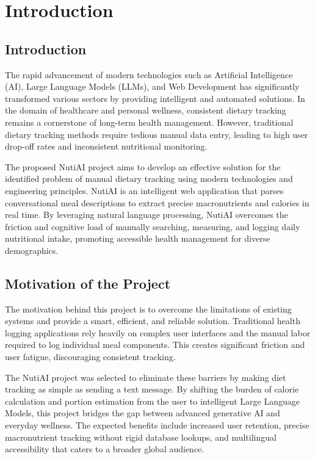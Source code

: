 \documentclass[12pt,a4paper]{report}
\begin{document}
\chapter{Introduction} 

\section{Introduction}
The rapid advancement of modern technologies such as Artificial Intelligence (AI), Large Language Models (LLMs), and Web Development has significantly transformed various sectors by providing intelligent and automated solutions. In the domain of healthcare and personal wellness, consistent dietary tracking remains a cornerstone of long-term health management. However, traditional dietary tracking methods require tedious manual data entry, leading to high user drop-off rates and inconsistent nutritional monitoring. 

The proposed NutiAI project aims to develop an effective solution for the identified problem of manual dietary tracking using modern technologies and engineering principles. NutiAI is an intelligent web application that parses conversational meal descriptions to extract precise macronutrients and calories in real time. By leveraging natural language processing, NutiAI overcomes the friction and cognitive load of manually searching, measuring, and logging daily nutritional intake, promoting accessible health management for diverse demographics.

\section{Motivation of the Project}
The motivation behind this project is to overcome the limitations of existing systems and provide a smart, efficient, and reliable solution. Traditional health logging applications rely heavily on complex user interfaces and the manual labor required to log individual meal components. This creates significant friction and user fatigue, discouraging consistent tracking.

The NutiAI project was selected to eliminate these barriers by making diet tracking as simple as sending a text message. By shifting the burden of calorie calculation and portion estimation from the user to intelligent Large Language Models, this project bridges the gap between advanced generative AI and everyday wellness. The expected benefits include increased user retention, precise macronutrient tracking without rigid database lookups, and multilingual accessibility that caters to a broader global audience.
\end{document}
